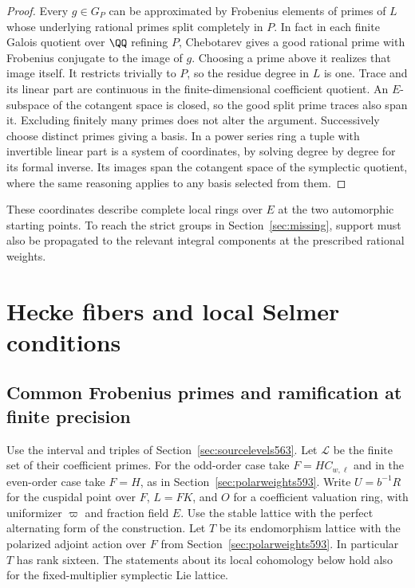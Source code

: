 \documentclass[a4paper,11pt]{article}
\theoremstyle{definition}
\theoremstyle{remark}
\numberwithin{equation}{section}
\begin{document}
\begin{proof}
Every \(g\in G_P\) can be approximated by Frobenius elements
of primes of \(L\) whose underlying rational primes split
completely in \(P\). In fact in each finite Galois quotient
over \(\QQ\) refining \(P\), Chebotarev gives a good rational
prime with Frobenius conjugate to the image of \(g\). Choosing
a prime above it realizes that image itself. It restricts
trivially to \(P\), so the residue degree in \(L\) is one.
Trace and its linear part are continuous in the finite-dimensional
coefficient quotient. An \(E\)-subspace of the cotangent space
is closed, so the good split prime traces also span it. Excluding
finitely many primes does not alter the argument. Successively
choose distinct primes giving a basis. In a power series ring
a tuple with invertible linear part is a system of coordinates,
by solving degree by degree for its formal inverse. Its images
span the cotangent space of the symplectic quotient, where the
same reasoning applies to any basis selected from them.
\end{proof}

These coordinates describe complete local rings over \(E\)
at the two automorphic starting points. To reach the strict
groups in Section~\ref{sec:missing}, support must also be
propagated to the relevant integral components at the
prescribed rational weights.

\section{Hecke fibers and local Selmer conditions}\label{nav:chapter-ordinary-hecke-fibers}

\subsection{Common Frobenius primes and ramification at finite precision}
\label{sec:tameprimes594}

Use the interval and triples of Section~\ref{sec:sourcelevels563}.
Let \(\mathcal L\) be the finite set of their coefficient primes.
For the odd-order case take \(F=HC_{w,\ell}\) and in the even-order
case take \(F=H\), as in Section~\ref{sec:polarweights593}.
Write \(U=b^{-1}R\) for the cuspidal point over \(F\), \(L=FK\),
and \(O\) for a coefficient valuation ring, with uniformizer
\(\varpi\) and fraction field \(E\). Use the stable lattice with
the perfect alternating form of the construction. Let \(T\) be
its endomorphism lattice with the polarized adjoint action over
\(F\) from Section~\ref{sec:polarweights593}. In particular
\(T\) has rank sixteen. The statements about its local cohomology
below hold also for the fixed-multiplier symplectic Lie lattice.
\end{document}
